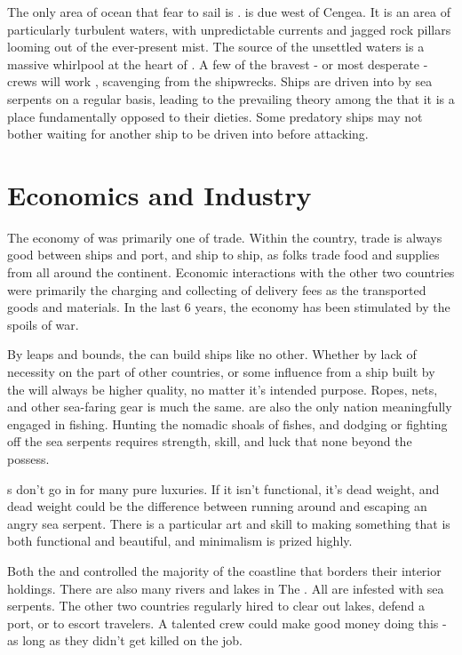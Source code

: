 \documentclass[blue]{GL2020}
\begin{document}
The only area of ocean that \pShippies{} fear to sail is \pWod{}. \pWod{} is due west of Cengea. It is an area of particularly turbulent waters, with unpredictable currents and jagged rock pillars looming out of the ever-present mist. The source of the unsettled waters is a massive whirlpool at the heart of \pWod{}. A few of the bravest - or most desperate - crews will work \pWod{}, scavenging from the shipwrecks. Ships are driven into \pWod{} by sea serpents on a regular basis, leading to the prevailing theory among the \pShippies{} that it is a place fundamentally opposed to their dieties. Some predatory ships may not bother waiting for another ship to be driven into \pWoD{} before attacking.

\section*{Economics and Industry}
The economy of \pShip{} was primarily one of trade. Within the country, trade is always good between ships and port, and ship to ship, as folks trade food and supplies from all around the continent. Economic interactions with the other two countries were primarily the charging and collecting of delivery fees as the \pShippies{} transported goods and materials. In the last 6 years, the economy has been stimulated by the spoils of war.

By leaps and bounds, the \pShippies{} can build ships like no other. Whether by lack of necessity on the part of other countries, or some influence from \cEbbFull{} a ship built by the \pShippies{} will always be higher quality, no matter it's intended purpose. Ropes, nets, and other sea-faring gear is much the same. \pShippies{} are also the only nation meaningfully engaged in fishing. Hunting the nomadic shoals of fishes, and dodging or fighting off the sea serpents requires strength, skill, and luck that none beyond the \pShippies{} possess.

\pShippies{}s don't go in for many pure luxuries. If it isn't functional, it's dead weight, and dead weight could be the difference between running around and escaping an angry sea serpent. There is a particular art and skill to making something that is both functional and beautiful, and minimalism is prized highly.

Both the \pFarm{} and \pTech{} controlled the majority of the coastline that borders their interior holdings. There are also many rivers and lakes in The \pFarm{}. All are infested with sea serpents. The other two countries regularly hired \pShippies{} to clear out lakes, defend a port, or to escort travelers. A talented crew could make good money doing this - as long as they didn't get killed on the job.
\end{document}
